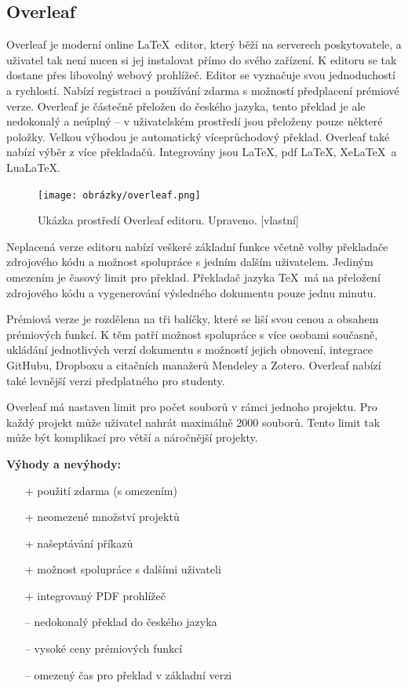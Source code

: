 \subsection{Overleaf}
Overleaf je moderní online \LaTeX\ editor, který běží na serverech poskytovatele, a uživatel tak není nucen si jej instalovat přímo do svého zařízení. K editoru se tak dostane přes libovolný webový prohlížeč. Editor se vyznačuje svou jednoduchostí a rychlostí. Nabízí registraci a používání zdarma s možností předplacení prémiové verze. Overleaf je částečně přeložen do českého jazyka, tento překlad je ale nedokonalý a neúplný -- v uživatelském prostředí jsou přeloženy pouze některé položky. Velkou výhodou je automatický víceprůchodový překlad. Overleaf také nabízí výběr z více překladačů. Integrovány jsou \LaTeX, pdf \LaTeX, Xe\LaTeX\ a Lua\LaTeX. \cite{Overleaf}

\begin{figure}[h]
	\centering
	\texttt{[image: obrázky/overleaf.png]}
	\caption[Ukázka prostředí Overleaf editoru.]{Ukázka prostředí Overleaf editoru. Upraveno. [vlastní]}
	\label{fig:overleaf}
\end{figure}

Neplacená verze editoru nabízí veškeré základní funkce včetně volby překladače zdrojového kódu a možnost spolupráce s jedním dalším uživatelem. Jediným omezením je časový limit pro překlad. Překladač jazyka \TeX\ má na přeložení zdrojového kódu a vygenerování výsledného dokumentu pouze jednu minutu. \cite{Overleafpremium}

Prémiová verze je rozdělena na tři balíčky, které se liší svou cenou a obsahem prémiových funkcí. K těm patří možnost spolupráce s více osobami současně, ukládání jednotlivých verzí dokumentu s možností jejich obnovení, integrace GitHubu, Dropboxu a citačních manažerů Mendeley a Zotero. Overleaf nabízí také levnější verzi předplatného pro studenty. \cite{Overleafpremiumtab}

Overleaf má nastaven limit pro počet souborů v rámci jednoho projektu. Pro každý projekt může uživatel nahrát maximálně 2000 souborů. Tento limit tak může být komplikací pro větší a náročnější projekty. \cite{Overleaflimity}

\textbf{Výhody a nevýhody:}
\begin{multicols}{2}
	\begin{itemize}
		\item [+] použití zdarma (s omezením)
		\item [+] neomezené množství projektů
		\item [+] našeptávání příkazů
		\item [+] možnost spolupráce s dalšími uživateli
		\item [+] integrovaný PDF prohlížeč
	\columnbreak
		\item [--] nedokonalý překlad do českého jazyka
		\item [--] vysoké ceny prémiových funkcí
		\item [--] omezený čas pro překlad v základní verzi
	\end{itemize}
\end{multicols}

